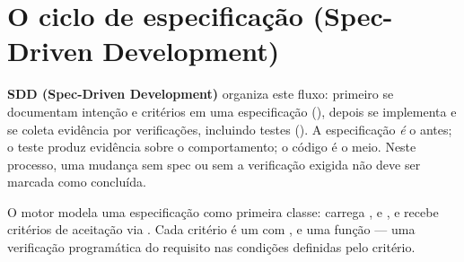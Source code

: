 \section{O ciclo de especificação (Spec-Driven Development)}

\begin{conceito}
\textbf{SDD (Spec-Driven Development)} organiza este fluxo: primeiro se
documentam intenção e critérios em uma especificação (),
depois se implementa e se coleta evidência por verificações, incluindo testes
(). A especificação \emph{é} o
antes; o teste produz evidência sobre o comportamento; o código é o meio. Neste
processo, uma mudança sem spec ou sem a verificação exigida não deve ser marcada
como concluída.
\end{conceito}


\begin{descricao}
O motor modela uma especificação como primeira classe: 
carrega ,  e , e recebe critérios de
aceitação via . Cada critério é um
 com ,  e uma
função  — uma verificação programática do requisito nas condições
definidas pelo critério.
\end{descricao}

